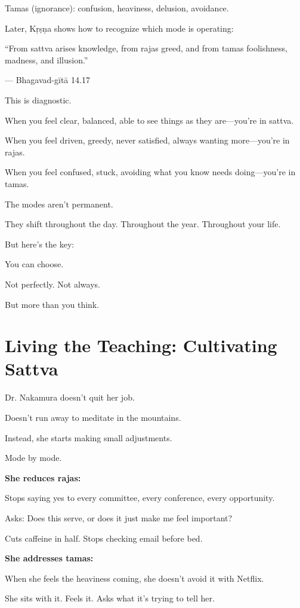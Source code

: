 \documentclass[11pt,twoside]{book}
\begin{document}
Tamas (ignorance): confusion, heaviness, delusion, avoidance.

Later, Kṛṣṇa shows how to recognize which mode is operating:

\begin{pullquote}
``From sattva arises knowledge, from rajas greed, and from tamas foolishness, madness, and illusion.''

--- Bhagavad-gītā 14.17
\end{pullquote}

This is diagnostic.

When you feel clear, balanced, able to see things as they are—you're in sattva.

When you feel driven, greedy, never satisfied, always wanting more—you're in rajas.

When you feel confused, stuck, avoiding what you know needs doing—you're in tamas.

The modes aren't permanent.

They shift throughout the day. Throughout the year. Throughout your life.

But here's the key:

You can choose.

Not perfectly. Not always.

But more than you think.

\section*{Living the Teaching: Cultivating Sattva}

Dr. Nakamura doesn't quit her job.

Doesn't run away to meditate in the mountains.

Instead, she starts making small adjustments.

Mode by mode.

\textbf{\textbf{She reduces rajas:}}

Stops saying yes to every committee, every conference, every opportunity.

Asks: Does this serve, or does it just make me feel important?

Cuts caffeine in half. Stops checking email before bed.

\textbf{\textbf{She addresses tamas:}}

When she feels the heaviness coming, she doesn't avoid it with Netflix.

She sits with it. Feels it. Asks what it's trying to tell her.
\end{document}
